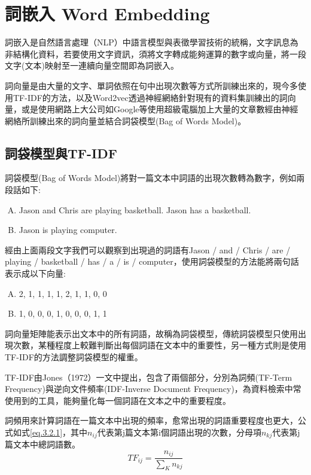\section{詞嵌入 Word Embedding}
	詞嵌入是自然語言處理（NLP）中語言模型與表徵學習技術的統稱，文字訊息為非結構化資料，若要使用文字資訊，須將文字轉成能夠運算的數字或向量，將一段文字(文本)映射至一連續向量空間即為詞嵌入。
		
	詞向量是由大量的文字、單詞依照在句中出現次數等方式所訓練出來的，現今多使用TF-IDF的方法，以及Word2vec透過神經網絡針對現有的資料集訓練出的詞向量，或是使用網路上大公司如Google等使用超級電腦加上大量的文章數經由神經網絡所訓練出來的詞向量並結合詞袋模型(Bag of Words Model)。
	

\subsection{詞袋模型與TF-IDF}

	詞袋模型(Bag of Words Model)將對一篇文本中詞語的出現次數轉為數字，例如兩段話如下:
\begin{enumerate}[A.]
\setlength{\itemsep}{-10pt}
\item Jason and Chris are playing basketball. Jason has a basketball.\item Jason is playing computer.
\end{enumerate}

	經由上面兩段文字我們可以觀察到出現過的詞語有Jason / and / Chris / are / playing / basketball / has / a / is / computer，使用詞袋模型的方法能將兩句話表示成以下向量:
\begin{enumerate}[A.]
\setlength{\itemsep}{-10pt}
\item \text{[} 2, 1, 1, 1, 1, 2, 1, 1, 0, 0 \text{]}
\item \text{[} 1, 0, 0, 0, 1, 0, 0, 0, 1, 1 \text{]}
\end{enumerate}

	詞向量矩陣能表示出文本中的所有詞語，故稱為詞袋模型，傳統詞袋模型只使用出現次數，某種程度上較難判斷出每個詞語在文本中的重要性，另一種方式則是使用TF-IDF的方法調整詞袋模型的權重。
	
	TF-IDF由Jones（1972）一文中提出，包含了兩個部分，分別為詞頻(TF-Term Frequency)與逆向文件頻率(IDF-Inverse Document Frequency)，為資料檢索中常使用到的工具，能夠量化每一個詞語在文本之中的重要程度。
	
	詞頻用來計算詞語在一篇文本中出現的頻率，愈常出現的詞語重要程度也更大，公式如式\ref{eq.3.2.1}，其中$n_{ij}$代表第j篇文本第i個詞語出現的次數，分母項$n_{kj}$代表第j篇文本中總詞語數。
\begin{equation}\label{eq.3.2.1}
TF_{ij}=\frac{n_{ij}}{\sum_{K}^{}n_{kj}}
\end{equation}

